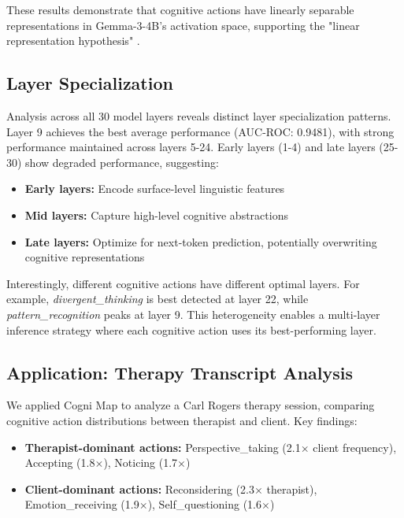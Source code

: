 \documentclass[letterpaper]{article}
\begin{document}
These results demonstrate that cognitive actions have linearly separable representations in Gemma-3-4B's activation space, supporting the "linear representation hypothesis" \cite{zou2023representation, alain2016understanding}.

\subsection{Layer Specialization}

Analysis across all 30 model layers reveals distinct layer specialization patterns. Layer 9 achieves the best average performance (AUC-ROC: 0.9481), with strong performance maintained across layers 5-24. Early layers (1-4) and late layers (25-30) show degraded performance, suggesting:
\begin{itemize}
    \item \textbf{Early layers:} Encode surface-level linguistic features
    \item \textbf{Mid layers:} Capture high-level cognitive abstractions
    \item \textbf{Late layers:} Optimize for next-token prediction, potentially overwriting cognitive representations
\end{itemize}

Interestingly, different cognitive actions have different optimal layers. For example, \textit{divergent\_thinking} is best detected at layer 22, while \textit{pattern\_recognition} peaks at layer 9. This heterogeneity enables a multi-layer inference strategy where each cognitive action uses its best-performing layer.

\subsection{Application: Therapy Transcript Analysis}

We applied Cogni Map to analyze a Carl Rogers therapy session, comparing cognitive action distributions between therapist and client. Key findings:
\begin{itemize}
    \item \textbf{Therapist-dominant actions:} Perspective\_taking (2.1$\times$ client frequency), Accepting (1.8$\times$), Noticing (1.7$\times$)
    \item \textbf{Client-dominant actions:} Reconsidering (2.3$\times$ therapist), Emotion\_receiving (1.9$\times$), Self\_questioning (1.6$\times$)
\end{itemize}
\end{document}
